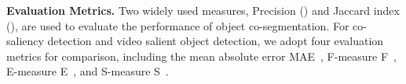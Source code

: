 \documentclass[journal]{IEEEtran}
\begin{document}
\vspace{1.0ex}

\noindent \textbf{Evaluation Metrics.} Two widely used measures, Precision () and Jaccard index (), are used to evaluate the performance of object co-segmentation. For co-saliency detection and video salient object detection, we adopt four evaluation metrics for comparison, including the mean absolute error MAE~\cite{perazzi2012saliency}, F-measure F~\cite{achanta2009frequency}, E-measure E~\cite{fan2018enhanced}, and S-measure S~\cite{fan2017structure}.

\vspace{1.0ex}




\begin{table}[]
    \centering
    \vspace{5pt}
        
    \caption{Analysis of different modules and their combinations.}\label{table1}
\end{table}
\end{document}
